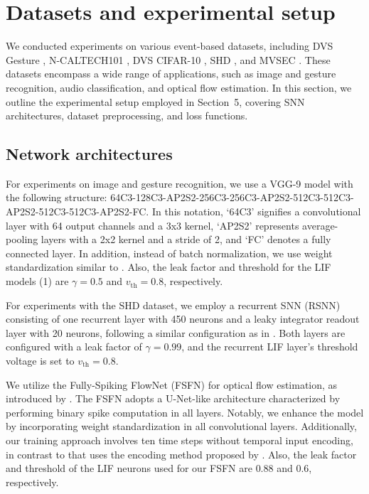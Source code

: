 \documentclass[10pt]{article} %
\begin{document}



\appendix

\section{Datasets and experimental setup}\label{sec:experimental_setup}
    We conducted experiments on various event-based datasets, including DVS Gesture \citep{Amir2017ASystem}, N-CALTECH101 \citep{Orchard2015ConvertingSaccades}, DVS CIFAR-10 \citep{Li2017CIFAR10-DVS:Classification}, SHD \citep{Cramer2022TheNetworks}, and MVSEC \citep{Zhu2018ThePerception}. 
    These datasets encompass a wide range of applications, such as image and gesture recognition, audio classification, and optical flow estimation. 
    In this section, we outline the experimental setup employed in Section~5, covering SNN architectures, dataset preprocessing, and loss functions.

        \subsection{Network architectures}\label{sec:net_architectures}
        For experiments on image and gesture recognition, we use a VGG-9 model with the following structure: 64C3-128C3-AP2S2-256C3-256C3-AP2S2-512C3-512C3-AP2S2-512C3-512C3-AP2S2-FC.
        In this notation, `64C3' signifies a convolutional layer with 64 output channels and a 3x3 kernel, `AP2S2' represents average-pooling layers with a 2x2 kernel and a stride of 2, and `FC' denotes a fully connected layer. 
        In addition, instead of batch normalization, we use weight standardization \cite{Qiao2019Micro-BatchStandardization} similar to \cite{Xiao2022OnlineNetworks}. 
        Also, the leak factor and threshold for the LIF models (1) are $\gamma=0.5$ and $v_{\mathrm{th}}=0.8$, respectively.

        For experiments with the SHD dataset, we employ a recurrent SNN (RSNN) consisting of one recurrent layer with 450 neurons and a leaky integrator readout layer with 20 neurons, following a similar configuration as in \cite{Ortner2023OnlineProjection, Quintana2023ETLP:Hardware}. 
        Both layers are configured with a leak factor of $\gamma=0.99$, and the recurrent LIF layer's threshold voltage is set to $v_{\mathrm{th}}=0.8$.


        We utilize the Fully-Spiking FlowNet (FSFN) for optical flow estimation, as introduced by \cite{Apolinario2023Hardware/SoftwareNetworks}. 
        The FSFN adopts a U-Net-like architecture characterized by performing binary spike computation in all layers. 
        Notably, we enhance the model by incorporating weight standardization \citep{Qiao2019Micro-BatchStandardization} in all convolutional layers. 
        Additionally, our training approach involves ten time steps without temporal input encoding, in contrast to \cite{Apolinario2023Hardware/SoftwareNetworks} that uses the encoding method proposed by \cite{Lee2020Spike-FlowNet:Networks}.
        Also, the leak factor and threshold of the LIF neurons used for our FSFN are $0.88$ and $0.6$, respectively.
\end{document}

